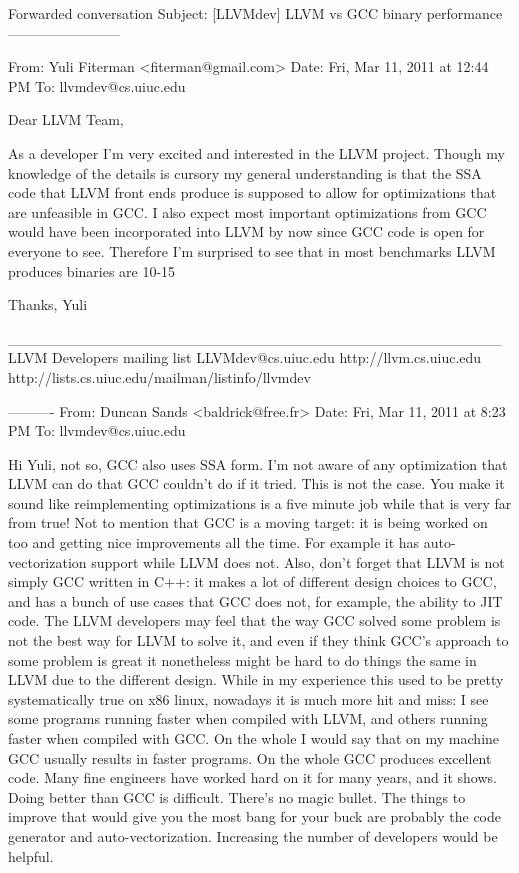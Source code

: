 

Forwarded conversation
Subject: [LLVMdev] LLVM vs GCC binary performance
------------------------

From: Yuli Fiterman <fiterman@gmail.com>
Date: Fri, Mar 11, 2011 at 12:44 PM
To: llvmdev@cs.uiuc.edu


Dear LLVM Team,

     As a developer I'm very excited and interested in the LLVM project. Though my knowledge of the details is cursory my general understanding is that the SSA code that LLVM front ends produce is supposed to allow for optimizations that are unfeasible in GCC. I also expect most important optimizations from GCC would have been incorporated into LLVM by now since GCC code is open for everyone to see. Therefore I'm surprised to see that in most benchmarks LLVM produces binaries are 10-15%

     Thanks,
     Yuli
      

     _______________________________________________
     LLVM Developers mailing list
     LLVMdev@cs.uiuc.edu         http://llvm.cs.uiuc.edu
     http://lists.cs.uiuc.edu/mailman/listinfo/llvmdev


     ----------
     From: Duncan Sands <baldrick@free.fr>
     Date: Fri, Mar 11, 2011 at 8:23 PM
     To: llvmdev@cs.uiuc.edu


     Hi Yuli,
     not so, GCC also uses SSA form.  I'm not aware of any optimization that LLVM can
     do that GCC couldn't do if it tried.
     This is not the case.  You make it sound like reimplementing optimizations is
     a five minute job while that is very far from true!  Not to mention that GCC is
     a moving target: it is being worked on too and getting nice improvements all the
     time.  For example it has auto-vectorization support while LLVM does not.  Also,
     don't forget that LLVM is not simply GCC written in C++: it makes a lot of
     different design choices to GCC, and has a bunch of use cases that GCC does not,
     for example, the ability to JIT code.  The LLVM developers may feel that the way
     GCC solved some problem is not the best way for LLVM to solve it, and even if
     they think GCC's approach to some problem is great it nonetheless might be hard
     to do things the same in LLVM due to the different design.
     While in my experience this used to be pretty systematically true on x86
     linux, nowadays it is much more hit and miss: I see some programs running
     faster when compiled with LLVM, and others running faster when compiled with
     GCC.  On the whole I would say that on my machine GCC usually results in faster
     programs.
     On the whole GCC produces excellent code.  Many fine engineers have worked hard
     on it for many years, and it shows.  Doing better than GCC is difficult.
     There's no magic bullet.  The things to improve that would give you the most
     bang for your buck are probably the code generator and auto-vectorization.
     Increasing the number of developers would be helpful.

